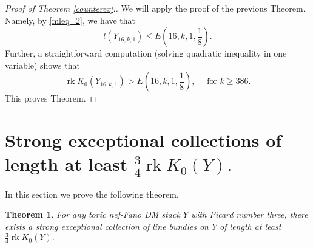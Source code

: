\documentclass[11pt,leqno]{amsart}
\newtheorem{theo}{Theorem}[section]
\numberwithin{equation}{section}
\newcommand{\rk}{\operatorname{rk}}
\begin{document}
\begin{proof}[Proof of Theorem \ref{counterex}.] We will apply the proof of the previous Theorem. Namely, by \eqref{mleq_2},
we have that $$l(Y_{16,k,1})\leq E(16,k,1,\frac18).$$
Further, a straightforward computation (solving quadratic inequality in one variable) shows that
$$\rk K_0(Y_{16,k,1})>E(16,k,1,\frac18),\quad\text{ for }k\geq 386.$$
This proves Theorem.
\end{proof}

\section{Strong exceptional collections of length at least $\frac34\rk K_0(Y).$}
\label{at_least_sect}

In this section we prove the following theorem.

\begin{theo}\label{at least}For any toric nef-Fano DM stack $Y$ with Picard number three, there exists a strong exceptional collection of line bundles on $Y$
of length at least $\frac34 \rk K_0(Y).$\end{theo}
\end{document}
